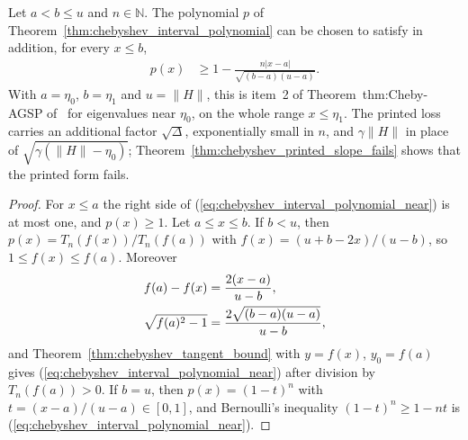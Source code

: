 \begin{theorem}
    \label{thm:chebyshev_interval_polynomial_near}
    \leanok
    Let $a<b\le u$ and $n\in\mathbb N$. The polynomial $p$ of
    Theorem~\ref{thm:chebyshev_interval_polynomial} can be chosen to satisfy in
    addition, for every $x\le b$,
    \begin{align}
        p(x) & \ge1-\frac{n\lvert x-a\rvert}{\sqrt{(b-a)(u-a)}}.
        \label{eq:chebyshev_interval_polynomial_near}
    \end{align}
    With $a=\eta_0$, $b=\eta_1$ and $u=\|H\|$, this is item~2 of
    Theorem~thm:Cheby-AGSP of~\cite[lines 822--824]{Arad2016RigorousRG} for
    eigenvalues near $\eta_0$, on the whole range $x\le\eta_1$. The printed
    loss carries an additional factor $\sqrt\Delta$, exponentially small in
    $n$, and $\gamma\|H\|$ in place of $\sqrt{\gamma(\|H\|-\eta_0)}$;
    Theorem~\ref{thm:chebyshev_printed_slope_fails} shows that the printed
    form fails.
\end{theorem}
\begin{proof}\leanok
    For $x\le a$ the right side of
    (\ref{eq:chebyshev_interval_polynomial_near}) is at most one, and
    $p(x)\ge1$. Let $a\le x\le b$. If $b<u$, then $p(x)=T_n(f(x))/T_n(f(a))$
    with $f(x)=(u+b-2x)/(u-b)$, so $1\le f(x)\le f(a)$. Moreover
    \begin{align}
        f(a)-f(x)       & =\frac{2(x-a)}{u-b},\notag             \\
        \sqrt{f(a)^2-1} & =\frac{2\sqrt{(b-a)(u-a)}}{u-b},\notag
    \end{align}
    and Theorem~\ref{thm:chebyshev_tangent_bound} with $y=f(x)$, $y_0=f(a)$
    gives (\ref{eq:chebyshev_interval_polynomial_near}) after division by
    $T_n(f(a))>0$. If $b=u$, then $p(x)=(1-t)^n$ with
    $t=(x-a)/(u-a)\in[0,1]$, and Bernoulli's inequality
    $(1-t)^n\ge1-nt$ is (\ref{eq:chebyshev_interval_polynomial_near}).
\end{proof}

